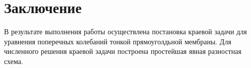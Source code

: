 {{%
%
%		
%
		 
		\newpage
	}
	




\titleformat{\section}{\large\bfseries\centering}{\thesection}{0.5em}{\MakeUppercase}
\section*{Заключение}
{
	В результате выполнения работы осуществлена постановка краевой
задачи для уравнения поперечных колебаний тонкой прямоуголдьной мембраны. Для
численного решения краевой задачи построена простейшая явная разностная схема.

}}
